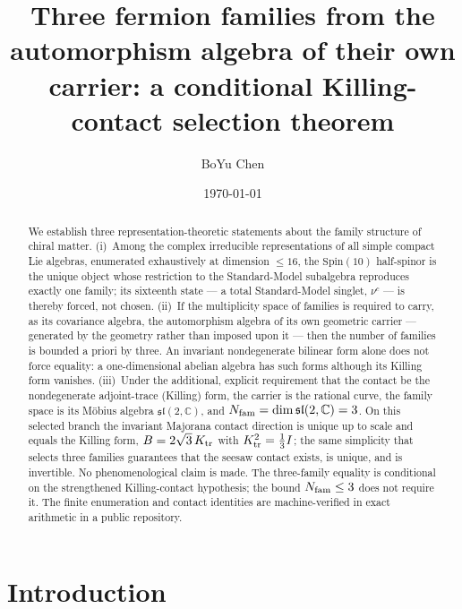 \documentclass[
  aps,prd,superscriptaddress,nofootinbib,preprint
]{revtex4-2}
\theoremstyle{remark}
\newcommand{\Spin}{\mathrm{Spin}}
\newcommand{\sltwo}{\mathfrak{sl}(2,\mathbb C)}
\newcommand{\Ktr}{K_{\rm tr}}
\begin{document}
\title{Three fermion families from the automorphism algebra of their
own carrier: a conditional Killing-contact selection theorem}

\author{BoYu Chen}

\date{\today}

\begin{abstract}
We establish three representation-theoretic statements about the family
structure of chiral matter.  (i)~Among the complex irreducible
representations of all simple compact Lie algebras, enumerated
exhaustively at dimension $\le 16$, the $\Spin(10)$ half-spinor is the
unique object whose restriction to the Standard-Model subalgebra
reproduces exactly one family; its sixteenth state --- a total
Standard-Model singlet, $\nu^c$ --- is thereby forced, not chosen.
(ii)~If the multiplicity space of families is required to carry, as its
covariance algebra, the automorphism algebra of its own geometric
carrier --- generated by the geometry rather than imposed upon it ---
then the number of families is bounded a priori by three.  An invariant
nondegenerate bilinear form alone does not force equality: a
one-dimensional abelian algebra has such forms although its Killing
form vanishes.  (iii)~Under the additional, explicit requirement that
the contact be the nondegenerate adjoint-trace (Killing) form, the
carrier is the rational curve, the family space is its M\"obius algebra
$\sltwo$, and $N_{\rm fam}=\dim\sltwo=3$.  On this selected branch the
invariant Majorana contact direction is unique up to scale and equals
the Killing form,
$B=2\sqrt3\,\Ktr$ with $\Ktr^2=\tfrac13 I$; the same simplicity that
selects three families guarantees that the seesaw contact exists, is
unique, and is invertible.  No phenomenological claim is made.  The
three-family equality is conditional on the strengthened Killing-contact
hypothesis; the bound $N_{\rm fam}\le3$ does not require it.  The finite
enumeration and contact identities are machine-verified in exact
arithmetic in a public repository.
\end{abstract}

\maketitle

\section{Introduction}
\end{document}
